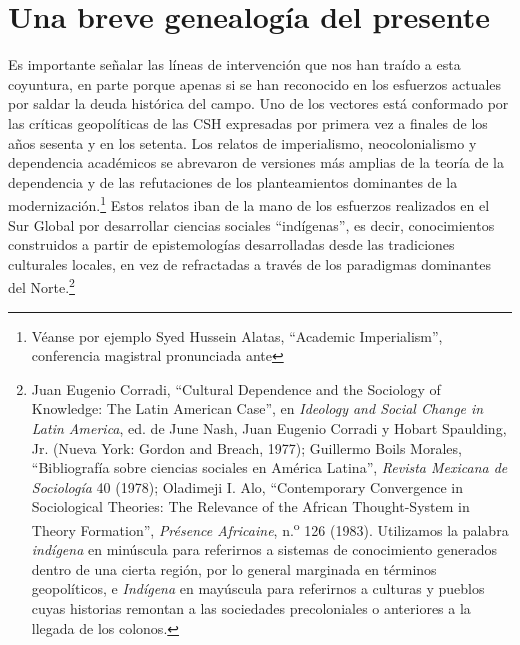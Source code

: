 \documentclass{tufte-handout}
\begin{document}
\hypertarget{una-breve-genealoguxeda-del-presente}{%
\section{Una breve genealogía del
presente}\label{una-breve-genealoguxeda-del-presente}}

Es importante señalar las líneas de intervención que nos han traído a
esta coyuntura, en parte porque apenas si se han reconocido en los
esfuerzos actuales por saldar la deuda histórica del campo. Uno de los
vectores está conformado por las críticas geopolíticas de las CSH
expresadas por primera vez a finales de los años sesenta y en los
setenta. Los relatos de imperialismo, neocolonialismo y dependencia
académicos se abrevaron de versiones más amplias de la teoría de la
dependencia y de las refutaciones de los planteamientos dominantes de la
modernización.\footnote{Véanse por ejemplo Syed Hussein Alatas,
  ``Academic Imperialism'', conferencia magistral pronunciada ante} Estos
relatos iban de la mano de los esfuerzos realizados en el Sur Global por
desarrollar ciencias sociales ``indígenas'', es decir, conocimientos
construidos a partir de epistemologías desarrolladas desde las
tradiciones culturales locales, en vez de refractadas a través de los
paradigmas dominantes del Norte.\footnote{Juan Eugenio Corradi,
  ``Cultural Dependence and the Sociology of Knowledge: The Latin
  American Case'', en \emph{Ideology and Social Change in Latin
  America}, ed. de June Nash, Juan Eugenio Corradi y Hobart Spaulding,
  Jr. (Nueva York: Gordon and Breach, 1977); Guillermo Boils Morales,
  ``Bibliografía sobre ciencias sociales en América Latina'',
  \emph{Revista Mexicana de Sociología} 40 (1978); Oladimeji I. Alo,
  ``Contemporary Convergence in Sociological Theories: The Relevance of
  the African Thought-System in Theory Formation'', \emph{Présence
  Africaine}, n.\textsuperscript{o} 126 (1983). Utilizamos la palabra
  \emph{indígena} en minúscula para referirnos a sistemas de
  conocimiento generados dentro de una cierta región, por lo general
  marginada en términos geopolíticos, e \emph{Indígena} en mayúscula
  para referirnos a culturas y pueblos cuyas historias remontan a las
  sociedades precoloniales o anteriores a la llegada de los colonos.}
\end{document}
